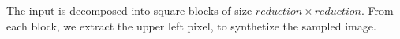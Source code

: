 The input is decomposed into square blocks of size $reduction\times
reduction$.
From each block, we extract the upper left pixel, to
synthetize the sampled image.
